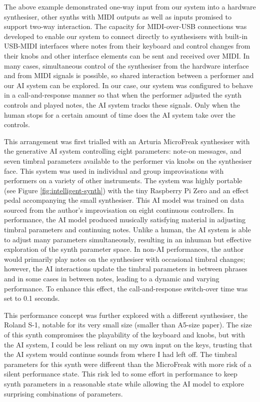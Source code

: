\documentclass[manuscript,review,anonymous]{acmart}
\begin{document}
The above example demonstrated one-way input from our system into a hardware synthesiser, other synths with MIDI outputs as well as inputs promised to support two-way interaction.
The capacity for MIDI-over-USB connections was developed to enable our system to connect directly to synthesisers with built-in USB-MIDI interfaces where notes from their keyboard and control changes from their knobs and other interface elements can be sent and received over MIDI.
In many cases, simultaneous control of the synthesiser from the hardware interface and from MIDI signals is possible, so shared interaction between a performer and our AI system can be explored. 
In our case, our system was configured to behave in a call-and-response manner so that when the performer adjusted the synth controls and played notes, the AI system tracks these signals. Only when the human stops for a certain amount of time does the AI system take over the controls.

This arrangement was first trialled with an Arturia MicroFreak synthesiser with the generative AI system controlling eight parameters: note-on messages, and seven timbral parameters available to the performer via knobs on the synthesiser face.
This system was used in individual and group improvisations with performers on a variety of other instruments.
The system was highly portable (see Figure \ref{fig:intelligent-synth}) with the tiny Raspberry Pi Zero and an effect pedal accompanying the small synthesiser.
This AI model was trained on data sourced from the author's improvisation on eight continuous controllers.
In performance, the AI model produced musically satisfying material in adjusting timbral parameters and continuing notes.
Unlike a human, the AI system is able to adjust many parameters simultaneously, resulting in an inhuman but effective exploration of the synth parameter space.
In non-AI performances, the author would primarily play notes on the synthesiser with occasional timbral changes; however, the AI interactions update the timbral parameters in between phrases and in some cases in between notes, leading to a dynamic and varying performance. 
To enhance this effect, the call-and-response switch-over time was set to 0.1 seconds.

This performance concept was further explored with a different synthesiser, the Roland S-1, notable for its very small size (smaller than A5-size paper).
The size of this synth compromises the playability of the keyboard and knobs, but with the AI system, I could be less reliant on my own input on the keys, trusting that the AI system would continue sounds from where I had left off.
The timbral parameters for this synth were different than the MicroFreak with more risk of a silent performance state.
This risk led to some effort in performance to keep synth parameters in a reasonable state while allowing the AI model to explore surprising combinations of parameters.
\end{document}
